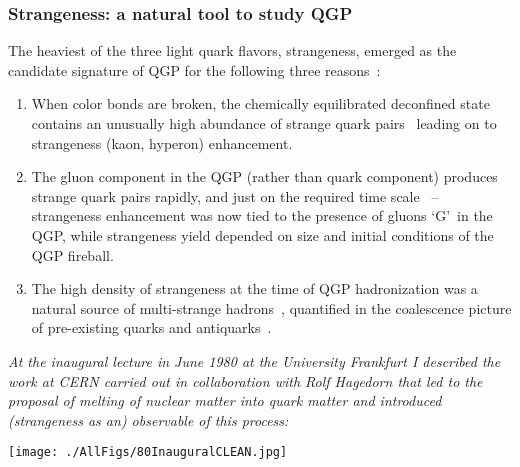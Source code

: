 \subsubsection{Strangeness: a natural tool to study QGP}\label{sec:ssig}

The heaviest of the three light quark flavors, strangeness, emerged as the candidate signature of QGP for the following three reasons~\cite{Koch:2017pda,Rafelski:1982ii}: 
\begin{enumerate} 
\item
When color bonds are broken, the chemically equilibrated deconfined state contains an unusually high abundance of strange quark pairs~\cite{Rafelski:1980rk,Rafelski:1980fy} leading on to strangeness (kaon, hyperon) enhancement. 
\item 
The gluon component in the QGP (rather than quark component) produces strange quark pairs rapidly, and just on the required time scale~\cite{Rafelski:1982pu} -- strangeness enhancement was now tied to the presence of gluons \lq G\rq\ in the QGP, while strangeness yield depended on size and initial conditions of the QGP fireball. 
\item The high density of strangeness at the time of QGP hadronization was a natural source of multi-strange hadrons~\cite{Rafelski:1982rq}, quantified in the coalescence picture of pre-existing quarks and antiquarks~\cite{Koch:1986ud}.
\end{enumerate}
\textit{At the inaugural lecture in June 1980 at the University Frankfurt I described the work at CERN carried out in collaboration with Rolf Hagedorn that led to the proposal of melting of nuclear matter into quark matter and introduced (strangeness as an) observable of this process:}\\[-0.7cm]
%
\begin{mdframed}[linecolor=gray,roundcorner=12pt,backgroundcolor=Dandelion!15,linewidth=1pt,leftmargin=0cm,rightmargin=0cm,topline=true,bottomline=true,skipabove=12pt]\relax%
\centerline{\texttt{[image: ./AllFigs/80InauguralCLEAN.jpg]}}
\end{mdframed}

